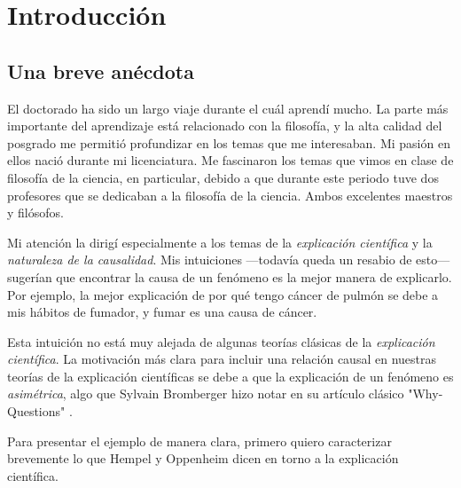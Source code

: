 
\chapter{Introducción}
\label{ch:introduction}

\section{Una breve anécdota}

\noindent El doctorado ha sido un largo viaje durante el cuál
aprendí mucho. La parte más importante del aprendizaje está
relacionado con la filosofía, y la alta calidad del posgrado me permitió
profundizar en los temas que me interesaban. Mi pasión en ellos nació
durante mi licenciatura. Me fascinaron los temas que vimos en clase
de  filosofía de la ciencia, en particular, debido a que durante este
periodo tuve dos profesores que se dedicaban a la filosofía de la
ciencia. Ambos excelentes maestros y filósofos.

Mi atención la dirigí especialmente a los temas de la
\emph{explicación científica} y la \emph{naturaleza de la
causalidad}. Mis intuiciones ---todavía queda un resabio de esto---
sugerían que encontrar la causa de un fenómeno es la mejor manera de
explicarlo. Por ejemplo, la mejor explicación de por qué tengo cáncer
de pulmón se debe a mis hábitos de fumador, y fumar es una causa de
cáncer.

Esta intuición no está muy alejada de algunas teorías clásicas de la
\emph{explicación científica}. La motivación más clara para
incluir una relación causal en nuestras teorías de la explicación
científicas se debe a que la explicación de un fenómeno es
\emph{asimétrica}, algo que Sylvain Bromberger hizo notar en su
artículo clásico "Why-Questions" \cite{Bromberger1966}.

Para presentar el ejemplo de manera clara, primero quiero
caracterizar brevemente lo que Hempel y Oppenheim dicen en torno a
la explicación científica.

